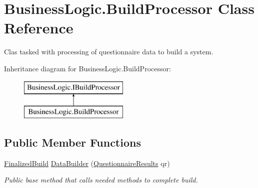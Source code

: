 \hypertarget{class_business_logic_1_1_build_processor}{}\section{Business\+Logic.\+Build\+Processor Class Reference}
\label{class_business_logic_1_1_build_processor}


Clas tasked with processing of questionnaire data to build a system.  


Inheritance diagram for Business\+Logic.\+Build\+Processor\+:\begin{figure}[H]
\begin{center}
\leavevmode
\includegraphics[height=2.000000cm]{class_business_logic_1_1_build_processor}
\end{center}
\end{figure}
\subsection*{Public Member Functions}
\begin{DoxyCompactItemize}
\item 
\hyperlink{class_business_objects_1_1_finalized_build}{Finalized\+Build} \hyperlink{class_business_logic_1_1_build_processor_a7466ec3a31a7752924ca815e1d8bd5fe}{Data\+Builder} (\hyperlink{class_business_objects_1_1_questionnaire_results}{Questionnaire\+Results} qr)
\begin{DoxyCompactList}\small\item\em Public base method that calls needed methods to complete build. \end{DoxyCompactList}\end{DoxyCompactItemize}
